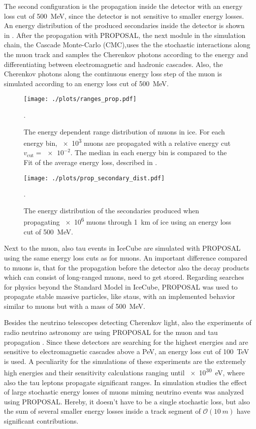 The second configuration is the propagation inside the detector with an energy loss cut of \SI{500}{MeV}, since the detector is not sensitive to smaller energy losses.
An energy distribution of the produced secondaries inside the detector is shown in .
After the propagation with PROPOSAL, the next module in the simulation chain, the Cascade Monte-Carlo (CMC),uses the the stochastic interactions along the muon track and samples the Cherenkov photons according to the energy and differentiating between electromagnetic and hadronic cascades.
Also, the Cherenkov photons along the continuous energy loss step of the muon is simulated according to an energy loss cut of \SI{500}{MeV}.
\begin{figure}[H]
    \centering
    \texttt{[image: ./plots/ranges\_prop.pdf]}
    \caption{The energy dependent range distribution of muons in ice. For each energy bin, \num{e3} muons are propagated with a relative energy cut $v_{\mathrm{cut}}=\num{e-2}$. The median in each energy bin is compared to the Fit of the average energy loss, described in .}
    \label{fig:prop_range}.
\end{figure}
\begin{figure}
    \centering
    \texttt{[image: ./plots/prop\_secondary\_dist.pdf]}
    \caption{The energy distribution of the secondaries produced when propagating \num{e6} muons through \SI{1}{km} of ice using an energy loss cut of \SI{500}{MeV}.}
    \label{fig:prop_sec_dist}.
\end{figure}

Next to the muon, also tau events in IceCube are simulated with PROPOSAL using the same energy loss cuts as for muons.
An important difference compared to muons is, that for the propagation before the detector also the decay products which can consist of long-ranged muons, need to get stored.
Regarding searches for physics beyond the Standard Model in IceCube, PROPOSAL was used to propagate stable massive particles, like staus, with an implemented behavior similar to muons but with a mass of \SI{500}{MeV}.

Besides the neutrino telescopes detecting Cherenkov light, also the experiments of radio neutrino astronomy are using PROPOSAL for the muon and tau propagation \cite{Glaser20nuRadioMC}.
Since these detectors are searching for the highest energies and are sensitive to electromagnetic cascades above a PeV, an energy loss cut of \SI{100}{TeV} is used.
A peculiarity for the simulations of these experiments are the extremely high energies and their sensitivity calculations ranging until \SI{e30}{eV}, where also the tau leptons propagate significant ranges.
In simulation studies \cite{GarciaFernandez2020RNOG} the effect of large stochastic energy losses of muons miming neutrino events was analyzed using PROPOSAL.
Hereby, it doesn't have to be a single stochastic loss, but also the sum of several smaller energy losses inside a track segment of $\mathcal{O}(\SI{10}{m})$ have significant contributions.

